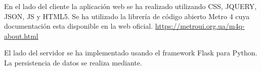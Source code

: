 En el lado del cliente la aplicación web se ha realizado utilizando CSS, JQUERY, JSON, JS y HTML5. Se ha utilizado la librería de código abierto Metro 4 cuya documentación esta disponible en la web oficial. \url{https://metroui.org.ua/m4q-about.html}

El lado del servidor se ha implementado usando el framework Flask para Python. La persistencia de datos se realiza mediante.